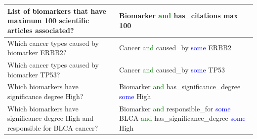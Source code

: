 \begin{table}
\begin{center}
\begin{tabular}{l|l}
                List of biomarkers that have maximum 100 scientific articles associated? & Biomarker \textcolor{green}{and} has\_citations max 100 \\\hline
                Which cancer types caused by biomarker ERBB2? & Cancer \textcolor{green}{and} caused\_by \textcolor{blue}{some} ERBB2 \\\hline
                Which cancer types caused by biomarker TP53? & Cancer \textcolor{green}{and} caused\_by \textcolor{blue}{some} TP53 \\\hline
                Which biomarkers have significance degree High? & Biomarker \textcolor{green}{and} has\_significance\_degree \textcolor{blue}{some} High \\\hline
                Which biomarkers have significance degree High and responsible for BLCA cancer? & Biomarker \textcolor{green}{and} responsible\_for \textcolor{blue}{some} BLCA \textcolor{green}{and} has\_significance\_degree \textcolor{blue}{some} High \\\hline
        \end{tabular}
        \vspace{-4mm}
    \end{center}
\end{table}
\fi 

